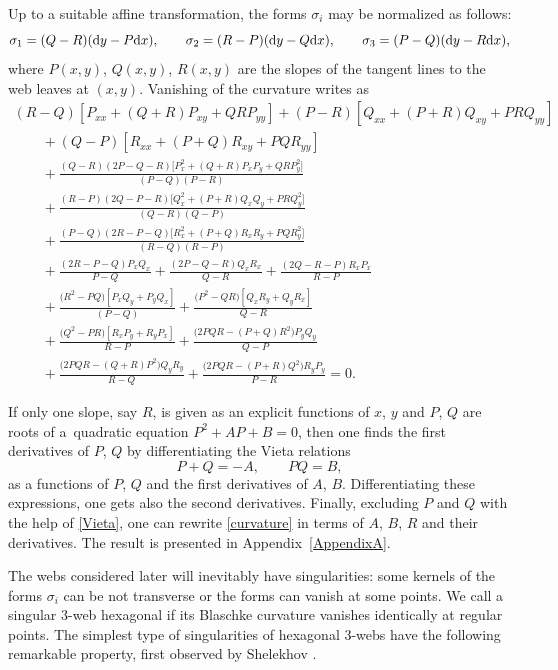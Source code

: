 \documentclass[pdftex]{sigma}
\numberwithin{equation}{section}
\begin{document}
Up to a suitable affine transformation, the forms $\sigma_i$ may be normalized as follows:
\[
\sigma_1=(Q - R)({\rm d}y - P{\rm d}x), \qquad \sigma_2=(R - P)({\rm d}y - Q{\rm d}x), \qquad \sigma_3=(P - Q)({\rm d}y - R{\rm d}x),
\]
where $P(x,y)$, $Q(x,y)$, $R(x,y)$ are the slopes of the tangent lines to the web leaves at $(x,y)$. Vanishing of the curvature writes as
\begin{gather}
(R-Q )[P_{xx} +(Q + R)P_{xy} +QRP_{yy}]+(P-R)[Q_{xx} +(P + R)Q_{xy}+PRQ_{yy}]\nonumber\\
\qquad{}+ (Q - P)[R_{xx} +(P + Q)R_{xy}+PQR_{yy}]\nonumber\\
\qquad{}+ \frac{(Q - R)(2P - Q - R)\bigl[P^2_x+(Q+R)P_xP_y+QRP^2_y\bigr]}{(P-Q )(P - R)}\nonumber \\
\qquad{} +
 \frac{(R-P )(2Q -P- R)\bigl[Q^2_x+(P+R)Q_xQ_y+PRQ_y^2\bigr]}{(Q - R)(Q-P)}
\nonumber \\
\qquad{}+ \frac{(P - Q)(2R-P-Q)\bigl[R_x^2+(P+Q)R_xR_y+PQR_y^2\bigr]}{(R-Q)(R - P)} \nonumber\\
\qquad{}+
\frac{(2R-P-Q)P_xQ_x }{P-Q}+
 \frac{(2P-Q-R)Q_xR_x}{Q - R}+
 \frac{(2Q-R-P)R_xP_x}{R-P} \nonumber\\
\qquad{}+ \frac{ \bigl(R^2-PQ\bigr)[P_xQ_y+P_yQ_x]}{(P - Q)} +
 \frac{\bigl(P^2 - QR\bigr)[Q_xR_y+Q_yR_x]}{Q-R} \nonumber\\
\qquad{} +
 \frac{\bigl(Q^2-PR\bigr)[R_xP_y+R_yP_x]}{R-P} + \frac{\bigl(2PQR -(P+Q)R^2\bigr)P_yQ_y}{Q-P}\nonumber\\
 \qquad{} +
\frac{\bigl(2PQR-(Q+R)P^2\bigr)Q_yR_y}{R-Q} +
\frac{\bigl(2PQR-(P+R)Q^2\bigr)R_yP_y }{P-R} =0.\label{curvature}
\end{gather}

If only one slope, say $R$, is given as an explicit functions of $x$, $y$ and $P$, $Q$ are roots of a~quadratic equation $P^2+AP+B=0$, then one finds the first derivatives of $P$, $Q$ by differentiating the Vieta relations
\begin{equation}\label{Vieta}
P+Q=-A,\qquad PQ=B,
\end{equation}
as a functions of $P$, $Q$ and the first derivatives of $A$, $B$. Differentiating these expressions, one gets also the second derivatives. Finally, excluding $P$ and $Q$ with the help of \eqref{Vieta}, one can rewrite \eqref{curvature} in terms of $A$, $B$, $R$ and their derivatives. The result is presented in Appendix~\ref{AppendixA}.

The webs considered later will inevitably have singularities: some kernels of the forms $\sigma_i$ can be not transverse or the forms can vanish at some points. We call a singular 3-web hexagonal if its Blaschke curvature vanishes identically at regular points. The simplest type of singularities of hexagonal 3-webs have the following remarkable property, first observed by Shelekhov \cite{S-05}.
\end{document}
